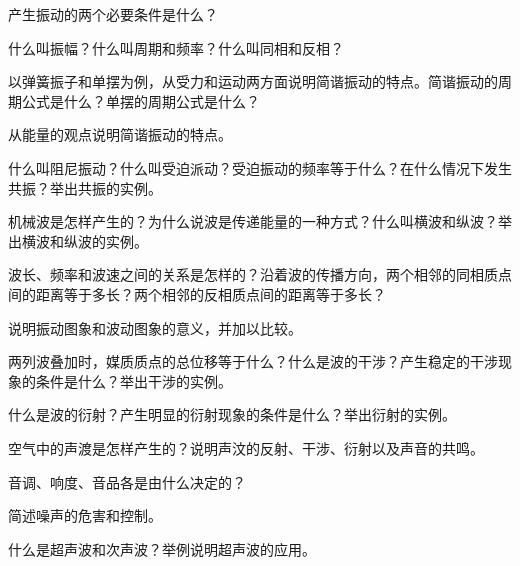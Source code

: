 \begin{Review}
\begin{question}
  \item 产生振动的两个必要条件是什么？
  \item 什么叫振幅？什么叫周期和频率？什么叫同相和反相？
  \item 以弹簧振子和单摆为例，从受力和运动两方面说明简谐振动的特点。简谐振动的周期公式是什么？单摆的周期公式是什么？
  \item 从能量的观点说明简谐振动的特点。
  \item 什么叫阻尼振动？什么叫受迫派动？受迫振动的频率等于什么？在什么情况下发生共振？举出共振的实例。
  \item 机械波是怎样产生的？为什么说波是传递能量的一种方式？什么叫横波和纵波？举出横波和纵波的实例。
  \item 波长、频率和波速之间的关系是怎样的？沿着波的传播方向，两个相邻的同相质点间的距离等于多长？两个相邻的反相质点间的距离等于多长？
  \item 说明振动图象和波动图象的意义，并加以比较。
  \item 两列波叠加时，媒质质点的总位移等于什么？什么是波的干涉？产生稳定的干涉现象的条件是什么？举出干涉的实例。
  \item 什么是波的衍射？产生明显的衍射现象的条件是什么？举出衍射的实例。
  \item 空气中的声渡是怎样产生的？说明声汶的反射、干涉、衍射以及声音的共鸣。
  \item 音调、响度、音品各是由什么决定的？
  \item 简述噪声的危害和控制。
  \item 什么是超声波和次声波？举例说明超声波的应用。
\end{question}
\end{Review}

